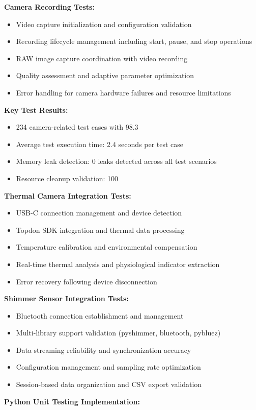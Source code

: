 \documentclass[12pt,a4paper]{report}
\begin{document}
\textbf{Camera Recording Tests:}

\begin{itemize}
\item Video capture initialization and configuration validation
\item Recording lifecycle management including start, pause, and stop operations
\item RAW image capture coordination with video recording
\item Quality assessment and adaptive parameter optimization
\item Error handling for camera hardware failures and resource limitations

\end{itemize}
\textbf{Key Test Results:}

\begin{itemize}
\item 234 camera-related test cases with 98.3%
\item Average test execution time: 2.4 seconds per test case
\item Memory leak detection: 0 leaks detected across all test scenarios
\item Resource cleanup validation: 100%

\end{itemize}
\textbf{Thermal Camera Integration Tests:}

\begin{itemize}
\item USB-C connection management and device detection
\item Topdon SDK integration and thermal data processing
\item Temperature calibration and environmental compensation
\item Real-time thermal analysis and physiological indicator extraction
\item Error recovery following device disconnection

\end{itemize}
\textbf{Shimmer Sensor Integration Tests:}

\begin{itemize}
\item Bluetooth connection establishment and management
\item Multi-library support validation (pyshimmer, bluetooth, pybluez)
\item Data streaming reliability and synchronization accuracy
\item Configuration management and sampling rate optimization
\item Session-based data organization and CSV export validation

\end{itemize}
\textbf{Python Unit Testing Implementation:}
\end{document}
